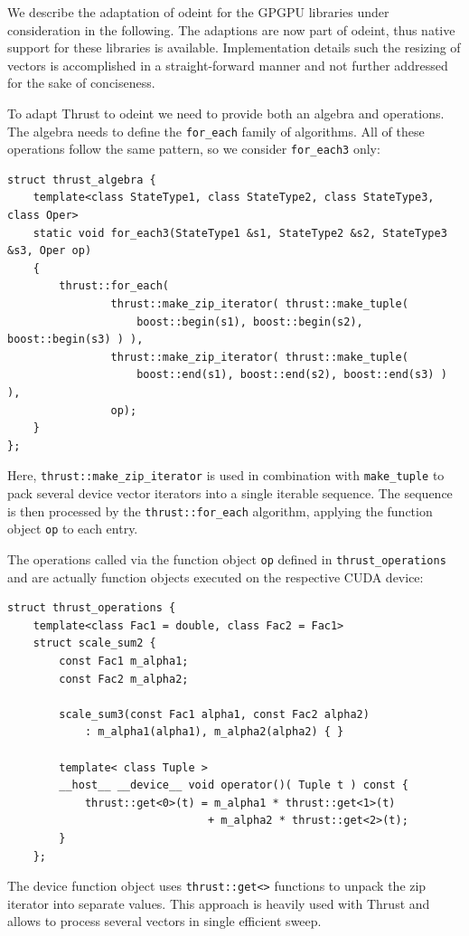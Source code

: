 \documentclass[final]{siamltex}
\newcommand{\code}[1]{\lstinline|#1|}
\begin{document}
We describe the adaptation of odeint for the GPGPU libraries under consideration
in the following. The adaptions are now part of odeint, thus native support
for these libraries is available.
Implementation details such the resizing of vectors is accomplished in a straight-forward manner
and not further addressed for the sake of conciseness.

To adapt Thrust to odeint we need to provide both an algebra and
operations. The algebra needs to define the \code{for_each} family of
algorithms. All of these operations follow the same pattern,
so we consider \code{for_each3} only:
\begin{lstlisting}
struct thrust_algebra {
    template<class StateType1, class StateType2, class StateType3, class Oper>
    static void for_each3(StateType1 &s1, StateType2 &s2, StateType3 &s3, Oper op)
    {
        thrust::for_each(
                thrust::make_zip_iterator( thrust::make_tuple(
                    boost::begin(s1), boost::begin(s2), boost::begin(s3) ) ),
                thrust::make_zip_iterator( thrust::make_tuple(
                    boost::end(s1), boost::end(s2), boost::end(s3) ) ),
                op);
    }
};
\end{lstlisting}
Here, \code{thrust::make_zip_iterator} is used in combination with \code{make_tuple}
to pack several device vector iterators into a single iterable sequence.
The sequence is then processed by the \code{thrust::for_each} algorithm, applying the function object
\code{op} to each entry.

The operations called via the function object \code{op} defined in \code{thrust_operations}
and are actually function objects executed on the respective CUDA device:
\begin{lstlisting}
struct thrust_operations {
    template<class Fac1 = double, class Fac2 = Fac1>
    struct scale_sum2 {
        const Fac1 m_alpha1;
        const Fac2 m_alpha2;

        scale_sum3(const Fac1 alpha1, const Fac2 alpha2)
            : m_alpha1(alpha1), m_alpha2(alpha2) { }

        template< class Tuple >
        __host__ __device__ void operator()( Tuple t ) const {
            thrust::get<0>(t) = m_alpha1 * thrust::get<1>(t)
                               + m_alpha2 * thrust::get<2>(t);
        }
    };
\end{lstlisting}
The device function object uses \code{thrust::get<>} functions to unpack the zip iterator into separate values.
This approach is heavily used with Thrust and allows to process several vectors
in single efficient sweep.
\end{document}
